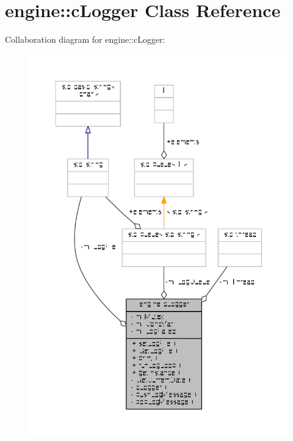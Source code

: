 \hypertarget{classengine_1_1cLogger}{\section{engine\-:\-:c\-Logger Class Reference}
\label{classengine_1_1cLogger}
}


Collaboration diagram for engine\-:\-:c\-Logger\-:
\nopagebreak
\begin{figure}[H]
\begin{center}
\leavevmode
\includegraphics[width=350pt]{classengine_1_1cLogger__coll__graph}
\end{center}
\end{figure}
